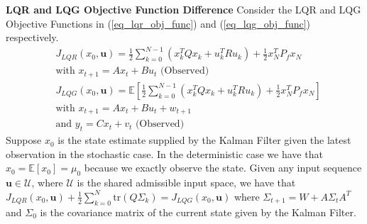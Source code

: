 \begin{thrm}
\textbf{LQR and LQG Objective Function Difference} Consider the LQR and LQG Objective Functions in (\ref{eq_lqr_obj_func}) and (\ref{eq_lqg_obj_func}) respectively. 
\begin{align}
&J_{LQR}(x_0, \mathbf{u}) = \frac{1}{2}\sum_{k=0}^{N-1} \left( x_k^TQx_k + u_k^TRu_k \right) + \frac{1}{2}x_N^TP_fx_N \label{eq_lqr_obj_func} \\
& \text{with } x_{t+1} = Ax_t +Bu_t \text{ (Observed)} \nonumber\\
& J_{LQG}(x_0, \mathbf{u}) =  \mathbb{E}\left[ \frac{1}{2}\sum_{k=0}^{N-1} \left( x_k^TQx_k + u_k^TRu_k \right) + \frac{1}{2}x_N^TP_fx_N \right] \label{eq_lqg_obj_func} \\
& \text{with } x_{t+1} = Ax_t +Bu_t + w_{t+1} \nonumber \\
& \text{and } y_{t} = Cx_t + v_t \text{ (Observed)} \nonumber
\end{align}
Suppose $x_0$ is the state estimate supplied by the Kalman Filter given the latest observation in the stochastic case. In the deterministic case we have that $x_0 = \mathbb{E}[x_0] = \mu_0$ because we exactly observe the state. Given any input sequence $\mathbf{u} \in \mathcal{U}$, where $\mathcal{U}$ is the shared admissible input space, we have that $J_{LQR}(x_0, \mathbf{u}) + \frac{1}{2}\sum_{k=0}^N \text{tr}(Q\Sigma_k) = J_{LQG}(x_0, \mathbf{u})$ where $ \Sigma_{t+1} = W+A\Sigma_t A^T$ and $\Sigma_0$ is the covariance matrix of the current state given by the Kalman Filter.
\label{thrm_lqr_lqg_diff}
\end{thrm}
